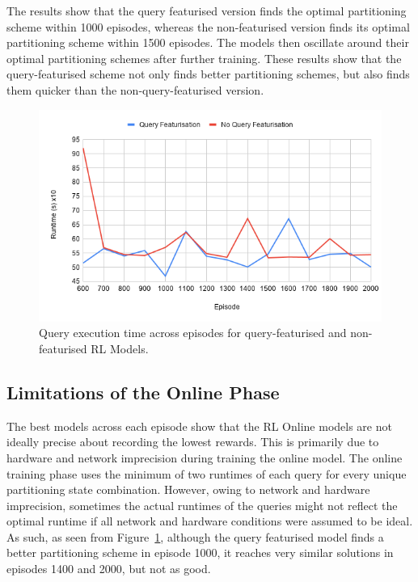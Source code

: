 The results show that the query featurised version finds the optimal partitioning scheme within 1000 episodes, whereas the non-featurised version finds its optimal partitioning scheme within 1500 episodes. The models then oscillate around their optimal partitioning schemes after further training. These results show that the query-featurised scheme not only finds better partitioning schemes, but also finds them quicker than the non-query-featurised version.


\begin{figure}[h]
  \centering
  \includegraphics[width=\linewidth]{figures/model-convergence.png}
  \caption{Query execution time across episodes for query-featurised and non-featurised RL Models.}
  \label{fig:model-convergence}
\end{figure}

\subsection{Limitations of the Online Phase}
\label{sec:limitations-of-online-phase}
The best models across each episode show that the RL Online models are not ideally precise about recording the lowest rewards. This is primarily due to hardware and network imprecision during training the online model. The online training phase uses the minimum of two runtimes of each query for every unique partitioning state combination. However, owing to network and hardware imprecision, sometimes the actual runtimes of the queries might not reflect the optimal runtime if all network and hardware conditions were assumed to be ideal. As such, as seen from Figure~\ref{fig:model-convergence}, although the query featurised model finds a better partitioning scheme in episode 1000, it reaches very similar solutions in episodes 1400 and 2000, but not as good. 

